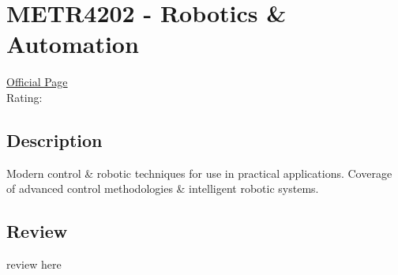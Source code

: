 \hypertarget{METR4202}{\section{METR4202 - Robotics \& Automation}}

\large
\textcolor{turbo_purple}{\href{https://my.uq.edu.au/programs-courses/course.html?course_code=METR4202}{Official Page}} \\
Rating: \cstar\cstar\cstar\cstar\ostar

\normalsize
\subsection*{Description}
Modern control \& robotic techniques for use in practical applications.
Coverage of advanced control methodologies \& intelligent robotic systems.

\subsection*{Review}
review here
